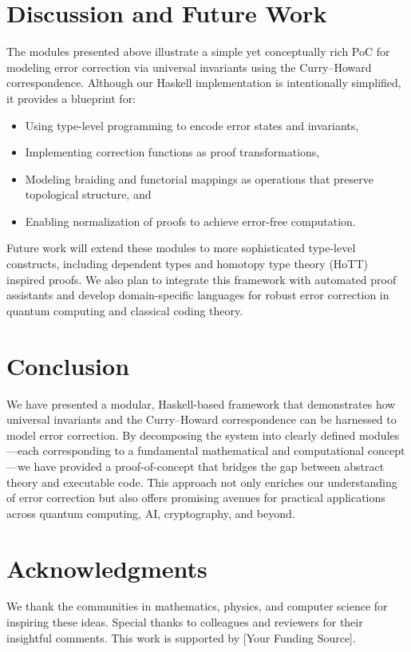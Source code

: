 \documentclass[12pt]{article}
\begin{document}
\newpage

\section{Discussion and Future Work}

The modules presented above illustrate a simple yet conceptually rich PoC for modeling error correction via universal invariants using the Curry–Howard correspondence. Although our Haskell implementation is intentionally simplified, it provides a blueprint for:
\begin{itemize}
  \item Using type-level programming to encode error states and invariants,
  \item Implementing correction functions as proof transformations,
  \item Modeling braiding and functorial mappings as operations that preserve topological structure, and
  \item Enabling normalization of proofs to achieve error-free computation.
\end{itemize}

Future work will extend these modules to more sophisticated type-level constructs, including dependent types and homotopy type theory (HoTT) inspired proofs. We also plan to integrate this framework with automated proof assistants and develop domain-specific languages for robust error correction in quantum computing and classical coding theory.

\section{Conclusion}

We have presented a modular, Haskell-based framework that demonstrates how universal invariants and the Curry–Howard correspondence can be harnessed to model error correction. By decomposing the system into clearly defined modules—each corresponding to a fundamental mathematical and computational concept—we have provided a proof-of-concept that bridges the gap between abstract theory and executable code. This approach not only enriches our understanding of error correction but also offers promising avenues for practical applications across quantum computing, AI, cryptography, and beyond.

\section*{Acknowledgments}
We thank the communities in mathematics, physics, and computer science for inspiring these ideas. Special thanks to colleagues and reviewers for their insightful comments. This work is supported by [Your Funding Source].
\end{document}
